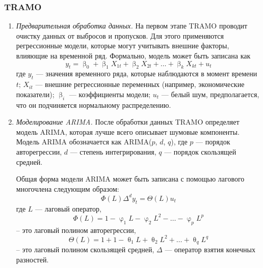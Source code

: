 \documentclass[a4paper, 14pt]{extreport}
\numberwithin{equation}{subsection}
\renewcommand{\beta}{\upbeta}
\renewcommand{\varphi}{\upvarphi}
\renewcommand{\theta}{\uptheta}
\numberwithin{equation}{section}
\begin{document}
	\subsubsection{TRAMO} 
	\begin{enumerate}
		\item \textit{Предварительная обработка данных.}
		На первом этапе TRAMO проводит очистку данных от выбросов и пропусков. Для этого применяются регрессионные модели, которые могут учитывать внешние факторы, влияющие на временной ряд. Формально, модель может быть записана как
		\begin{equation}
			y_t=\beta_0+\beta_1X_{1t}+\beta_2X_{2t}+\dots+\beta_kX_{kt}+u_t
		\end{equation}
		где $y_t$ --- значения временного ряда, которые наблюдаются в момент времени $t$; $X_{it}$ --- внешние регрессионные переменных (например, экономические показатели); $\beta_i$ --- коэффициенты модели; $u_t$ --- белый шум, предполагается, что он подчиняется нормальному распределению.
		\item \textit{Моделирование ARIMA.}
		После обработки данных TRAMO определяет модель ARIMA, которая лучше всего описывает шумовые компоненты. Модель ARIMA обозначается как ARIMA($p$, $d$, $q$), где $p$ --- порядок авторегрессии, $d$ --- степень интегрирования, $q$ --- порядок скользящей средней.
		
		Общая форма модели ARIMA может быть записана с помощью лагового многочлена следующим образом:
		\begin{equation}
			\Phi(L)\Delta^dy_t=\Theta(L)u_t
		\end{equation}
		где $L$ --- лаговый оператор, $$\Phi(L)=1-\varphi_1L-\varphi_2L^2-\ldots-\varphi_pL^p$$ -- это лаговый полином авторегрессии, $$\Theta(L)=1+1-\theta_1L+\theta_2L^2+\ldots+\theta_qL^q$$ -- это лаговый полином скользящей средней, $\Delta$ --- оператор взятия конечных разностей.
	\end{enumerate}
\end{document}
